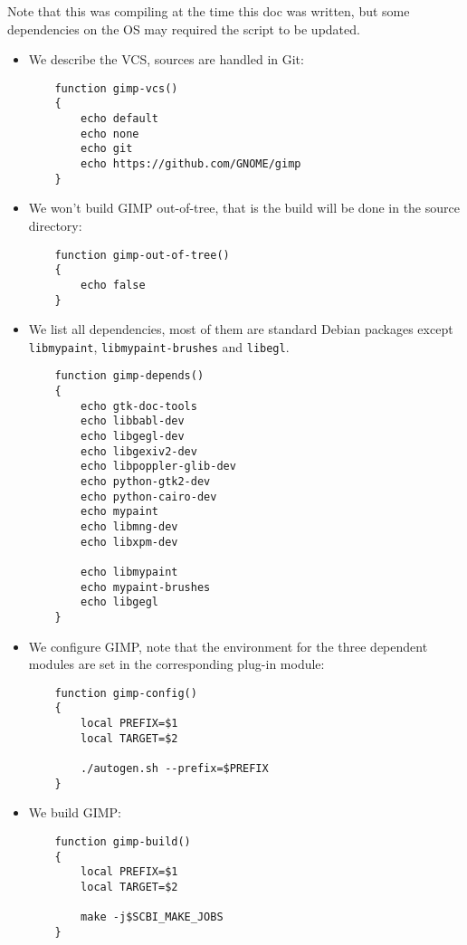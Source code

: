 \documentclass[a4paper,12pt,twoside]{article}
\newcommand{\code}[1]{\texttt{#1}}
\begin{document}
Note that this was compiling at the time this doc was written, but some dependencies on the OS may required the script to be updated.

\begin{itemize}
	\item We describe the VCS, sources are handled in Git:

	\begin{lstlisting}
	function gimp-vcs()
	{
		echo default
		echo none
		echo git
		echo https://github.com/GNOME/gimp
	}
	\end{lstlisting}

	\item We won't build GIMP out-of-tree, that is the build will be done in the source directory:

	\begin{lstlisting}
	function gimp-out-of-tree()
	{
		echo false
	}
	\end{lstlisting}

	\item We list all dependencies, most of them are standard Debian packages except \code{libmypaint}, \code{libmypaint-brushes} and \code{libegl}.

	\begin{lstlisting}
	function gimp-depends()
	{
		echo gtk-doc-tools
		echo libbabl-dev
		echo libgegl-dev
		echo libgexiv2-dev
		echo libpoppler-glib-dev
		echo python-gtk2-dev
		echo python-cairo-dev
		echo mypaint
		echo libmng-dev
		echo libxpm-dev

		echo libmypaint
		echo mypaint-brushes
		echo libgegl
	}
	\end{lstlisting}

	\item We configure GIMP, note that the environment for the three dependent modules are set in the corresponding plug-in module:

	\begin{lstlisting}
	function gimp-config()
	{
		local PREFIX=$1
		local TARGET=$2

		./autogen.sh --prefix=$PREFIX
	}
	\end{lstlisting}

	\item We build GIMP:

	\begin{lstlisting}
	function gimp-build()
	{
		local PREFIX=$1
		local TARGET=$2

		make -j$SCBI_MAKE_JOBS
	}
	\end{lstlisting}


\end{itemize}
\end{document}
